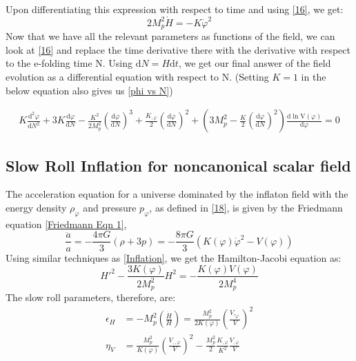 \documentclass[aps,prd,reprint,preprintnumbers,showpacs,floatfix,nofootinbib,superscript address]{revtex4-2}
\begin{document}
Upon differentiating this expression with respect to time and using \cref{16}, we get:
\begin{equation} \label{20}
    2 M_p^2 \dot{H} = -  K \dot{\varphi}^2
\end{equation}
Now that we have all the relevant parameters as functions of the field, we can look at \cref{16} and replace the time derivative there with the derivative with respect to the e-folding time N. Using $\text{d}N = H \text{d}t$, we get our final answer of the field evolution as a differential equation with respect to N. (Setting $K = 1$ in the below equation also gives us \cref{phi vs N})
\begin{widetext}
\begin{subequations}
\begin{align}\label{Kphi vs N}
    K\frac{\text{d}^2\varphi}{\text{d}N^2} +3 K \frac{\text{d}\varphi}{\text{d}N}  - \frac{K^2}{2M_p^2} \left(\frac{\text{d}\varphi}{\text{d}N} \right)^3  +  \frac{K_{,\varphi}}{2}  \left(\frac{\text{d}\varphi}{\text{d}N} \right)^2 +  \left( 3 M_p^2 - \frac{K}{2} \left(\frac{\text{d}\varphi}{\text{d}N} \right)^2 \right) \frac{\text{d}\ln \text{V}(\varphi)}{\text{d} \varphi} = 0    
\end{align}
\end{subequations}
\end{widetext}
\subsection{Slow Roll Inflation for noncanonical scalar field}
The acceleration equation for a universe dominated by the inflaton field with the energy density $\rho_{\varphi}$ and pressure $p_{\varphi}$, as defined in \cref{18}, is given by the Friedmann equation \cref{Friedmann Eqn 1},
\begin{equation}
    \frac{\ddot{a}}{a} = -\frac{4\pi G}{3} (\rho +3p) = -\frac{8\pi G}{3} (K(\varphi){\dot{\varphi}}^2 - V(\varphi)) 
\end{equation}
Using similar techniques as \cref{Inflation}, we get the Hamilton-Jacobi equation as: 
\begin{equation}    \label{KHJ}
    H'^2 - \frac{3K(\varphi)}{2M_p^2}H^2 = - \frac{K(\varphi) V(\varphi)}{2M_p^4} 
\end{equation}
The slow roll parameters, therefore, are:
\begin{align}
    \epsilon_H &= - M_p^2 \left(\frac{\dot{H}}{H} \right) = \frac{M_p^2}{2 K(\varphi)} \left(\frac{V,_\varphi}{V}\right)^2 \\
    \eta_V &= \frac{M_p^2}{K(\varphi)} \left( \frac{V_{,,\varphi}}{V} \right)^2 - \frac{M_p^2}{2} \frac{K_{,\varphi}}{K^2} \frac{V_{,\varphi}}{V}
\end{align}
\end{document}

